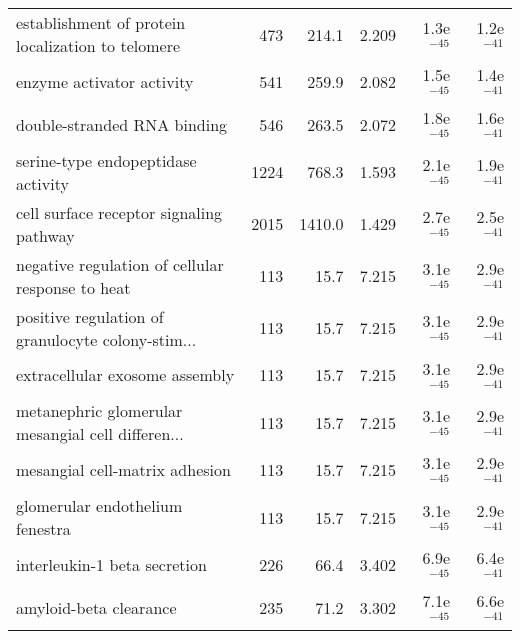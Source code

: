 \begin{longtable}{lrrrrr}
 establishment of protein localization to telomere &                     473 &                   214.1 &      2.209 &         1.3e$^{-45}$ &         1.2e$^{-41}$ \\
                         enzyme activator activity &                     541 &                   259.9 &      2.082 &         1.5e$^{-45}$ &         1.4e$^{-41}$ \\
                       double-stranded RNA binding &                     546 &                   263.5 &      2.072 &         1.8e$^{-45}$ &         1.6e$^{-41}$ \\
                serine-type endopeptidase activity &                    1224 &                   768.3 &      1.593 &         2.1e$^{-45}$ &         1.9e$^{-41}$ \\
           cell surface receptor signaling pathway &                    2015 &                  1410.0 &      1.429 &         2.7e$^{-45}$ &         2.5e$^{-41}$ \\
  negative regulation of cellular response to heat &                     113 &                    15.7 &      7.215 &         3.1e$^{-45}$ &         2.9e$^{-41}$ \\
 positive regulation of granulocyte colony-stim... &                     113 &                    15.7 &      7.215 &         3.1e$^{-45}$ &         2.9e$^{-41}$ \\
                    extracellular exosome assembly &                     113 &                    15.7 &      7.215 &         3.1e$^{-45}$ &         2.9e$^{-41}$ \\
 metanephric glomerular mesangial cell differen... &                     113 &                    15.7 &      7.215 &         3.1e$^{-45}$ &         2.9e$^{-41}$ \\
                    mesangial cell-matrix adhesion &                     113 &                    15.7 &      7.215 &         3.1e$^{-45}$ &         2.9e$^{-41}$ \\
                   glomerular endothelium fenestra &                     113 &                    15.7 &      7.215 &         3.1e$^{-45}$ &         2.9e$^{-41}$ \\
                      interleukin-1 beta secretion &                     226 &                    66.4 &      3.402 &         6.9e$^{-45}$ &         6.4e$^{-41}$ \\
                            amyloid-beta clearance &                     235 &                    71.2 &      3.302 &         7.1e$^{-45}$ &         6.6e$^{-41}$ \\

\end{longtable}
